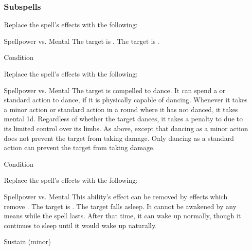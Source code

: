 \subsubsection{Subspells}
Replace the spell's effects with the following:
\begin{spellcontent}
\begin{augmenteffects}
\begin{spellattack}{Spellpower vs. Mental}
\spellsuccess The target is \disoriented.
\spellcritical The target is \confused.
\end{spellattack}
\spelldur Condition
\end{augmenteffects}
\end{spellcontent}
Replace the spell's effects with the following:
\begin{spellcontent}
\begin{augmenteffects}
\begin{spellattack}{Spellpower vs. Mental}
\spellsuccess
The target is compelled to dance.
It can spend a  or standard action to dance, if it is physically capable of dancing.
Whenever it takes a minor action or standard action in a round where it has not danced, it takes mental  \plus1d.
Regardless of whether the target dances, it takes a  penalty to  due to its limited control over its limbs.
\spellcritical
As above, except that dancing as a minor action does not prevent the target from taking damage.
Only dancing as a standard action can prevent the target from taking damage.
\end{spellattack}
\spelldur Condition
\end{augmenteffects}
\end{spellcontent}
Replace the spell's effects with the following:
\begin{spellcontent}
\begin{augmenteffects}
\begin{spellattack}{Spellpower vs. Mental}
\spellspecial This ability's effect can be removed by effects which remove .
\spellsuccess The target is \blinded.
\spellcritical
The target falls asleep.
It cannot be awakened by any means while the spell lasts.
After that time, it can wake up normally, though it continues to sleep until it would wake up naturally.
\end{spellattack}
\spelldur Sustain (minor)
\end{augmenteffects}
\end{spellcontent}
